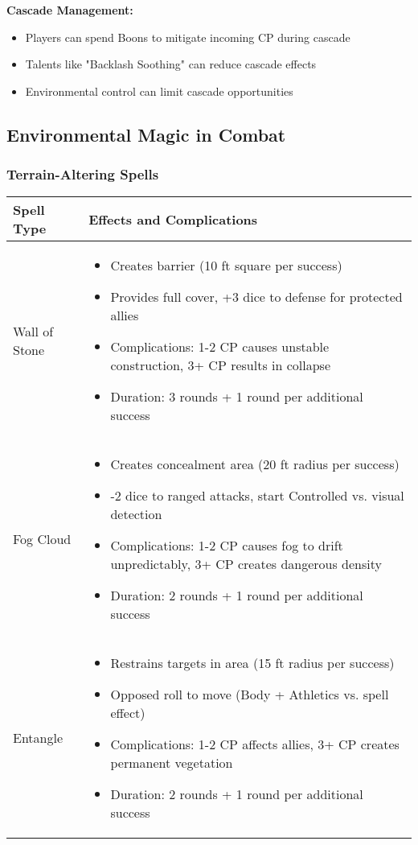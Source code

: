 \documentclass[11pt,letterpaper]{article}
\begin{document}
\textbf{Cascade Management:}
\begin{itemize}[leftmargin=*]
    \item Players can spend Boons to mitigate incoming CP during cascade
    \item Talents like "Backlash Soothing" can reduce cascade effects
    \item Environmental control can limit cascade opportunities
\end{itemize}

\subsection{Environmental Magic in Combat}

\subsubsection{Terrain-Altering Spells}

\begin{longtable}{|>{\raggedright\arraybackslash}p{4cm}|>{\raggedright\arraybackslash}p{8cm}|}
\hline
\textbf{Spell Type} & \textbf{Effects and Complications} \\
\hline
Wall of Stone & 
\begin{itemize}
    \item Creates barrier (10 ft square per success)
    \item Provides full cover, +3 dice to defense for protected allies
    \item Complications: 1-2 CP causes unstable construction, 3+ CP results in collapse
    \item Duration: 3 rounds + 1 round per additional success
\end{itemize} \\
\hline
Fog Cloud & 
\begin{itemize}
    \item Creates concealment area (20 ft radius per success)
    \item -2 dice to ranged attacks, start Controlled vs. visual detection
    \item Complications: 1-2 CP causes fog to drift unpredictably, 3+ CP creates dangerous density
    \item Duration: 2 rounds + 1 round per additional success
\end{itemize} \\
\hline
Entangle & 
\begin{itemize}
    \item Restrains targets in area (15 ft radius per success)
    \item Opposed roll to move (Body + Athletics vs. spell effect)
    \item Complications: 1-2 CP affects allies, 3+ CP creates permanent vegetation
    \item Duration: 2 rounds + 1 round per additional success
\end{itemize} \\
\hline
\end{longtable}
\end{document}
